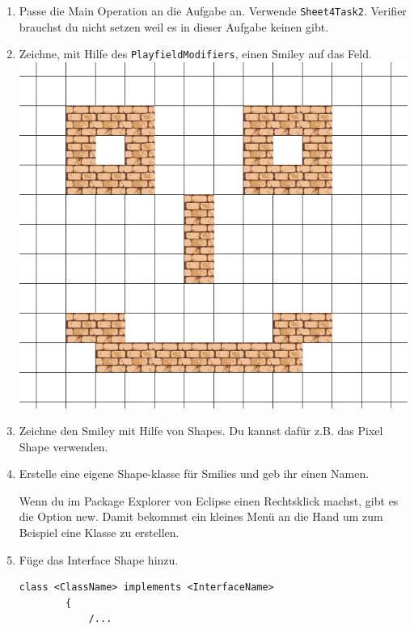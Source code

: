 \begin{enumerate}
    \item Passe die Main Operation an die Aufgabe an. Verwende \lstinline{Sheet4Task2}. Verifier brauchst du nicht setzen weil es in dieser Aufgabe keinen gibt.
    \item Zeichne, mit Hilfe des \lstinline{PlayfieldModifiers}, einen Smiley auf das Feld.
    \\ \includegraphics[width=\linewidth]{./figures/smily.png}
    \item Zeichne den Smiley mit Hilfe von Shapes. Du kannst dafür z.B. das Pixel Shape verwenden.
    \item Erstelle eine eigene Shape-klasse für Smilies und geb ihr einen Namen.
    \begin{Infobox}
        Wenn du im Package Explorer von Eclipse einen Rechtsklick machst, gibt es die Option new.
        Damit bekommst ein kleines Menü an die Hand um zum Beispiel eine Klasse zu erstellen.
    \end{Infobox}
    \item Füge das Interface Shape hinzu.
    \begin{lstlisting}[title=Interface Syntax,frame=ltr]
        class <ClassName> implements <InterfaceName>
        {
            /...
    \end{lstlisting}
    \begin{Infobox}[Interface]

\end{Infobox}
\end{enumerate}
